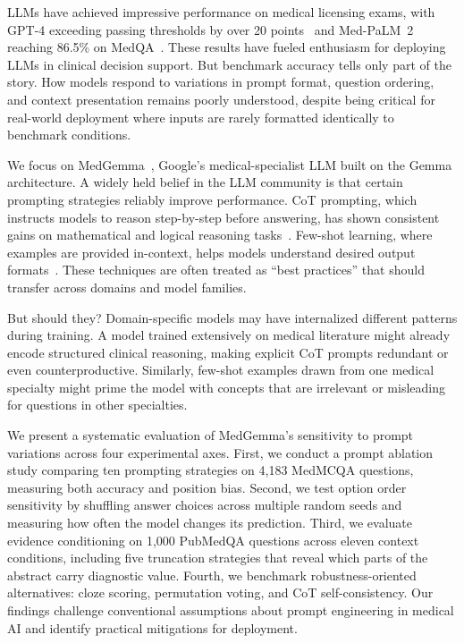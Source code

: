 \documentclass[runningheads,a4paper]{llncs}
\begin{document}
LLMs have achieved impressive performance on medical licensing exams, with GPT-4 exceeding passing thresholds by over 20 points~\cite{nori2023capabilities} and Med-PaLM~2 reaching 86.5\% on MedQA~\cite{singhal2023medpalm2}. These results have fueled enthusiasm for deploying LLMs in clinical decision support. But benchmark accuracy tells only part of the story. How models respond to variations in prompt format, question ordering, and context presentation remains poorly understood, despite being critical for real-world deployment where inputs are rarely formatted identically to benchmark conditions.

We focus on MedGemma~\cite{medgemma2025}, Google's medical-specialist LLM built on the Gemma architecture. A widely held belief in the LLM community is that certain prompting strategies reliably improve performance. CoT prompting, which instructs models to reason step-by-step before answering, has shown consistent gains on mathematical and logical reasoning tasks~\cite{wei2022chain}. Few-shot learning, where examples are provided in-context, helps models understand desired output formats~\cite{brown2020language}. These techniques are often treated as ``best practices'' that should transfer across domains and model families.

But should they? Domain-specific models may have internalized different patterns during training. A model trained extensively on medical literature might already encode structured clinical reasoning, making explicit CoT prompts redundant or even counterproductive. Similarly, few-shot examples drawn from one medical specialty might prime the model with concepts that are irrelevant or misleading for questions in other specialties.

We present a systematic evaluation of MedGemma's sensitivity to prompt variations across four experimental axes. First, we conduct a prompt ablation study comparing ten prompting strategies on 4,183 MedMCQA questions, measuring both accuracy and position bias. Second, we test option order sensitivity by shuffling answer choices across multiple random seeds and measuring how often the model changes its prediction. Third, we evaluate evidence conditioning on 1,000 PubMedQA questions across eleven context conditions, including five truncation strategies that reveal which parts of the abstract carry diagnostic value. Fourth, we benchmark robustness-oriented alternatives: cloze scoring, permutation voting, and CoT self-consistency. Our findings challenge conventional assumptions about prompt engineering in medical AI and identify practical mitigations for deployment.
\end{document}

